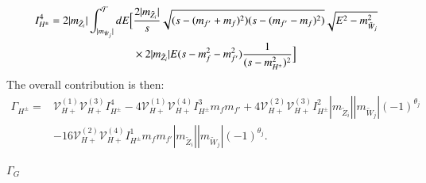 \documentclass[final,3p,times,pdflatex]{elsarticle}
\begin{document}
\begin{equation} \label{IHpm4}
\begin{aligned}
I_{H^{\pm}}^{4} = 2|m_{\tilde{Z}_i}| \int_{|m_{\tilde{W}_{j}}|}^{\mathcal{T}} dE \Big[ &{2|m_{\tilde{Z}_i}| \over s} \sqrt{(s-(m_{f'}+m_{f})^2)(s-(m_{f'}-m_{f})^2)} \sqrt{E^2 - m_{\tilde{W}_j}^2} \\ & \times 2|m_{\tilde{Z}_i}|E (s-m_{f}^2 - m_{f'}^2){1 \over (s - m_{H^{\pm}}^2)^2}\Big]
\end{aligned}
\end{equation}
The overall contribution is then:
\begin{equation}
\begin{aligned}
\Gamma_{H^{\pm}} = & \mathcal{V}_{H+}^{(1)} \mathcal{V}_{H+}^{(3)} I_{H^{\pm}}^{4} - 4 \mathcal{V}_{H+}^{(1)} \mathcal{V}_{H+}^{(4)} I_{H^{\pm}}^3 m_{f}m_{f'} + 4 \mathcal{V}_{H+}^{(2)} \mathcal{V}_{H+}^{(3)} I_{H^{\pm}}^{2} |m_{\tilde{Z}_i}||m_{\tilde{W}_j}|(-1)^{\theta_j} \\ & - 16 \mathcal{V}_{H+}^{(2)} \mathcal{V}_{H+}^{(4)} I_{H^{\pm}}^{1} m_{f} m_{f'}|m_{\tilde{Z}_i}||m_{\tilde{W}_j}|(-1)^{\theta_j}.
\end{aligned}
\end{equation}

\textbf{\underline{$\Gamma_{G}$}}
\end{document}
